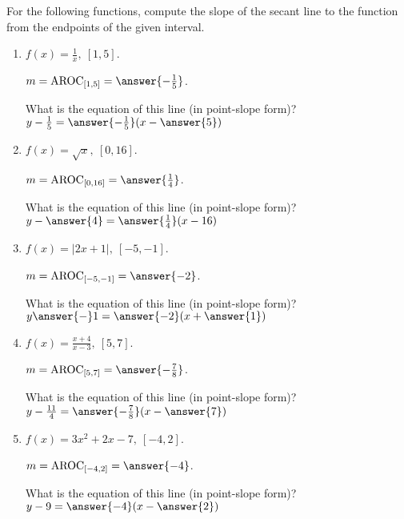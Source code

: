 \documentclass{ximera}
\author{Elizabeth Campolongo}
\begin{document}
\begin{exercise}

For the following functions, compute the slope of the secant line to the function from the endpoints of the given interval.

\begin{enumerate}
\item $f(x)= \frac{1}{x}, \ [1,5]$.

$m = \av_{[1, 5]} = \answer{-\frac{1}{5}}$.  
\begin{exercise}
What is the equation of this line (in point-slope form)?\\
$y-\frac{1}{5} = \answer{-\frac{1}{5}}(x-\answer{5})$
\end{exercise}

\item $f(x)= \sqrt{x}, \ [0,16]$.

$m = \av_{[0, 16]} = \answer{\frac{1}{4}}$.  
\begin{exercise}
What is the equation of this line (in point-slope form)?\\
$y-\answer{4} = \answer{\frac{1}{4}}(x-16)$
\end{exercise}

\item $f(x)= |2x+1|, \ [-5,-1]$.

$m = \av_{[-5,-1]} = \answer{-2}$.  
\begin{exercise}
What is the equation of this line (in point-slope form)?\\
$y\answer{-} 1= \answer{-2}(x+\answer{1})$
\end{exercise}


\item $f(x)= \frac{x+4}{x-3}, \ [5,7]$.

$m = \av_{[5, 7]} = \answer{-\frac{7}{8}}$.  
\begin{exercise}
What is the equation of this line (in point-slope form)?\\
$y-\frac{11}{4} = \answer{-\frac{7}{8}}(x-\answer{7})$
\end{exercise}

\item $f(x)= 3x^2 +2x-7, \ [-4,2]$.

$m = \av_{[-4, 2]} = \answer{-4}$.  
\begin{exercise}
What is the equation of this line (in point-slope form)?\\
$y-9 = \answer{-4}(x -\answer{2})$
\end{exercise}
	
\end{enumerate}

\end{exercise}
\end{document}
